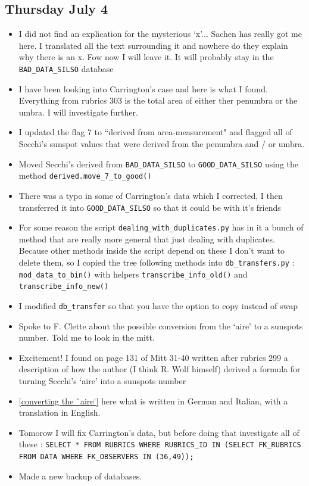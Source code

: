 \documentclass[12pt]{article}
\begin{document}
\subsection{Thursday July 4}
\begin{itemize}
    \item I did not find an explication for the mysterious `x'... Sachen has really got me here. I translated all the text surrounding it and nowhere do they explain why there is an x. Fow now I will leave it. It will probably stay in the \texttt{BAD\_DATA\_SILSO} database
    \item I have been looking into Carrington's case and here is what I found. Everything from rubrics 303 is the total area of either ther penumbra or the umbra. I will investigate further.
    \item I updated the flag 7 to ``derived from area-measurement" and flagged all of Secchi's sunspot values that were derived from the penumbra and / or umbra.
    \item Moved Secchi's derived from \texttt{BAD\_DATA\_SILSO} to \texttt{GOOD\_DATA\_SILSO} using the method \texttt{derived.move_7_to_good()}
    \item There was a typo in some of Carrington's data which I corrected, I then transferred it into \texttt{GOOD\_DATA\_SILSO} so that it could be with it's friends
    \item For some reason the script \texttt{dealing\_with\_duplicates.py} has in it a bunch of method that are really more general that just dealing with duplicates. Because other methods inside the script depend on these I don't want to delete them, so I copied the tree following methods into \texttt{db\_transfers.py} : \texttt{mod\_data\_to\_bin()} with helpers \texttt{transcribe\_info\_old()} and \texttt{transcribe\_info\_new()}
    \item I modified \texttt{db\_transfer} so that you have the option to copy instead of swap
    \item Spoke to F. Clette about the possible conversion from the `aire' to a sunspots number. Told me to look in the mitt.
    \item Excitement! I found on page 131 of Mitt 31-40 written after rubrics 299 a description of how the author (I think R. Wolf himself) derived a formula for turning Secchi's `aire' into a sunspots number
    \item \ref{converting the `aire'} here what is written in German and Italian, with a translation in English.
    \item Tomorow I will fix Carrington's data, but before doing that investigate all of these : \texttt{SELECT * FROM RUBRICS WHERE RUBRICS\_ID IN (SELECT FK\_RUBRICS FROM DATA WHERE FK\_OBSERVERS IN (36,49));}
    \item Made a new backup of databases.
\end{itemize}
        
\end{document}
